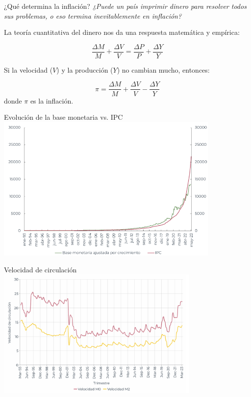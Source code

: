 \documentclass{beamer}
\begin{document}
\begin{frame}{¿Qué determina la inflación?}
    \textit{
    ¿Puede un país imprimir dinero para resolver todos sus problemas, o eso termina inevitablemente en inflación?
    }

    \vspace{1.2em}
    La teoría cuantitativa del dinero nos da una respuesta matemática y empírica:

    \[
    \frac{\Delta M}{M} + \frac{\Delta V}{V} = \frac{\Delta P}{P} + \frac{\Delta Y}{Y}
    \]

    Si la velocidad (\(V\)) y la producción (\(Y\)) no cambian mucho, entonces:

    \[
    \pi = \frac{\Delta M}{M} + \frac{\Delta V}{V} - \frac{\Delta Y}{Y}
    \]
    donde \(\pi\) es la inflación.

\end{frame}



\begin{frame}{Evolución de la base monetaria vs. IPC}
    \centering
    \includegraphics[width=11cm]{../Figures/C38.7.png}\
\end{frame}


\begin{frame}{Velocidad de circulación}
\centering\includegraphics[width=10cm]{../Figures/C38.10.png}\
\end{frame}
\end{document}
